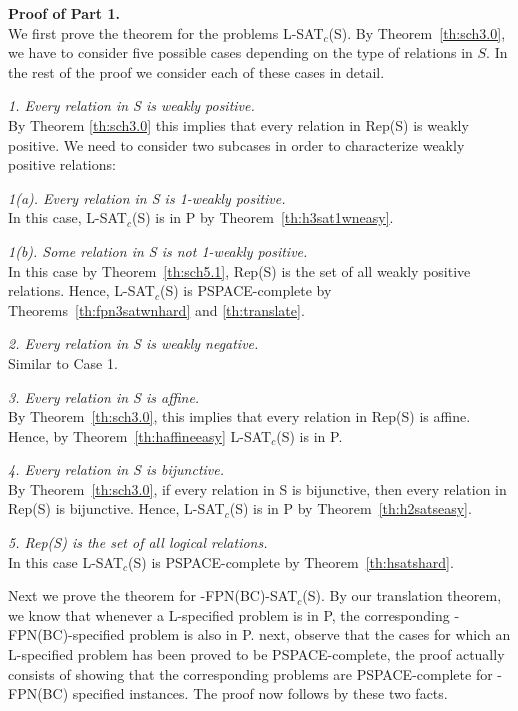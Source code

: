 \noindent
{\bf Proof of Part 1.}\\
We first prove the theorem for the problems L-SAT$_c$(S).
By Theorem~\ref{th:sch3.0}, we have to consider five possible cases
depending on the type of relations in $S$. In the rest of the proof we
consider each of these cases in detail.

\noindent
{\em 1. Every relation in {\sf S} is weakly positive.}\\
By Theorem \ref{th:sch3.0} this implies that 
every relation in {\sf Rep(S)} is weakly positive. 
We need to consider two subcases in order to characterize weakly positive
relations:

{\em  1(a). Every relation in {\sf S} is 1-weakly positive.}\\
In this case, 
{\sf L-SAT$_c$(S)} is in {\sf P} by Theorem~\ref{th:h3sat1wneasy}.

{\em   1(b). Some relation in {\sf S} is not 1-weakly positive.}\\
In this case by Theorem~\ref{th:sch5.1}, 
{\sf Rep(S)} is the set of all weakly positive relations.
Hence, {\sf L-SAT$_c$(S)} 
is {\sf PSPACE}-complete by Theorems~\ref{th:fpn3satwnhard}
and \ref{th:translate}.

\noindent
{\em 2. Every relation in {\sf S} is weakly negative.}\\
Similar to Case 1.

\noindent
{\em 3. Every relation in {\sf S} is affine.}\\
By Theorem~\ref{th:sch3.0}, this implies that
every relation in {\sf Rep(S)} is affine. Hence, 
by Theorem~\ref{th:haffineeasy}
{\sf L-SAT$_c$(S)} is in {\sf P}. 

\noindent
{\em 4.  Every relation in {\sf S} is bijunctive.}\\
By Theorem~\ref{th:sch3.0}, if every relation in {\sf S} is bijunctive,
then every relation in {\sf Rep(S)} is bijunctive. Hence, {\sf L-SAT$_c$(S)} 
is in {\sf P}  by Theorem~\ref{th:h2satseasy}.

\noindent
{\em 5. {\sf Rep(S)} is the set of all logical relations.}\\
In this case {\sf L-SAT$_c$(S)} 
is {\sf PSPACE}-complete by Theorem~\ref{th:hsatshard}.


Next we prove the theorem for {-FPN(BC)-SAT$_c$(S)}.
By our translation theorem, we know that whenever a {\sf L}-specified
problem is in {\sf P}, the corresponding {-FPN(BC)}-specified problem 
is also in {\sf P}.
next, observe that the cases for which an L-specified problem has been
proved to be {\sf PSPACE}-complete, the proof actually consists of showing that
the corresponding problems are {\sf PSPACE}-complete for {-FPN(BC)} 
specified instances. The proof now follows by these two facts.\\



